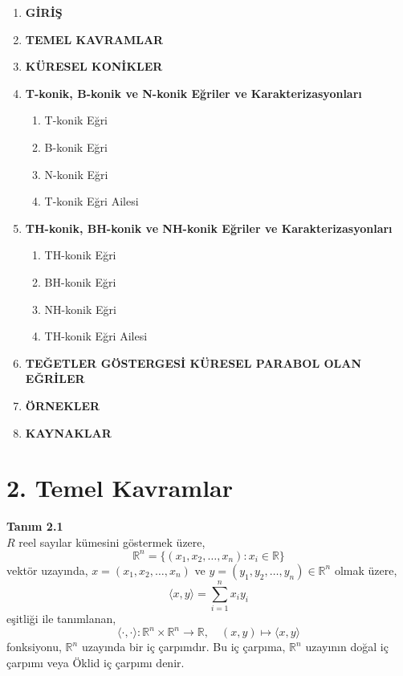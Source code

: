 \documentclass[a4paper,12pt]{article}
\begin{document}
\tableofcontents




\begin{enumerate}
    \item \textbf{GİRİŞ}
    \item \textbf{TEMEL KAVRAMLAR}
    \item \textbf{KÜRESEL KONİKLER}
    \item \textbf{T-konik, B-konik ve N-konik Eğriler ve Karakterizasyonları}
    \begin{enumerate}
        \item T-konik Eğri
        \item B-konik Eğri
        \item N-konik Eğri
        \item T-konik Eğri Ailesi
    \end{enumerate}
    \item \textbf{TH-konik, BH-konik ve NH-konik Eğriler ve Karakterizasyonları}
    \begin{enumerate}
        \item TH-konik Eğri
        \item BH-konik Eğri
        \item NH-konik Eğri
        \item TH-konik Eğri Ailesi
    \end{enumerate}
    \item \textbf{TEĞETLER GÖSTERGESİ KÜRESEL PARABOL OLAN EĞRİLER}
    \item \textbf{ÖRNEKLER}
    \item \textbf{KAYNAKLAR}
\end{enumerate}

\section*{2. Temel Kavramlar}

\textbf{Tanım 2.1} \\
$R$ reel sayılar kümesini göstermek üzere,
\[
\mathbb{R}^n = \{(x_1, x_2, \ldots, x_n) : x_i \in \mathbb{R} \}
\]
vektör uzayında, $x = (x_1, x_2, \ldots, x_n)$ ve $y = (y_1, y_2, \ldots, y_n) \in \mathbb{R}^n$ olmak üzere,
\[
\langle x, y \rangle = \sum_{i=1}^n x_i y_i
\]
eşitliği ile tanımlanan,
\[
\langle \cdot, \cdot \rangle : \mathbb{R}^n \times \mathbb{R}^n \to \mathbb{R}, \quad (x, y) \mapsto \langle x, y \rangle
\]
fonksiyonu, $\mathbb{R}^n$ uzayında bir iç çarpımdır. Bu iç çarpıma, $\mathbb{R}^n$ uzayının doğal iç çarpımı veya Öklid iç çarpımı denir.
\end{document}
